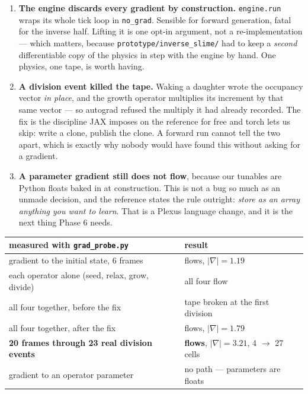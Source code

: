\documentclass[11pt,a4paper]{article}
\newcommand{\code}[1]{\texttt{#1}}
\begin{document}
\begin{enumerate}[leftmargin=1.4em]
\item \textbf{The engine discards every gradient by construction.} \code{engine.run} wraps its
whole tick loop in \code{no\_grad}. Sensible for forward generation, fatal for the inverse half.
Lifting it is one opt-in argument, not a re-implementation --- which matters, because
\code{prototype/inverse\_slime/} had to keep a \emph{second} differentiable copy of the physics in
step with the engine by hand. One physics, one tape, is worth having.
\item \textbf{A division event killed the tape.} Waking a daughter wrote the occupancy vector
\emph{in place}, and the growth operator multiplies its increment by that same vector --- so
autograd refused the multiply it had already recorded. The fix is the discipline JAX imposes on
the reference for free and torch lets us skip: write a clone, publish the clone. A forward run
cannot tell the two apart, which is exactly why nobody would have found this without asking for a
gradient.
\item \textbf{A parameter gradient still does not flow}, because our tunables are Python floats
baked in at construction. This is not a bug so much as an unmade decision, and the reference
states the rule outright: \emph{store as an array anything you want to learn}. That is a Plexus
language change, and it is the next thing Phase 6 needs.
\end{enumerate}

\begin{center}
\small
\begin{tabular}{@{}l l@{}}
\toprule
\textbf{measured with \code{grad\_probe.py}} & \textbf{result}\\
\midrule
gradient to the initial state, 6 frames & flows, $|\nabla| = 1.19$\\
each operator alone (seed, relax, grow, divide) & all four flow\\
all four together, before the fix & \textcolor{bad}{tape broken at the first division}\\
all four together, after the fix & flows, $|\nabla| = 1.79$\\
\textbf{20 frames through 23 real division events} & \textbf{flows}, $|\nabla| = 3.21$, 4 $\to$ 27 cells\\
gradient to an operator parameter & \textcolor{bad}{no path --- parameters are floats}\\
\bottomrule
\end{tabular}
\end{center}
\end{document}
